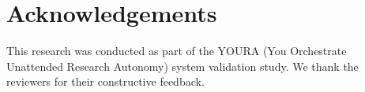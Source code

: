 \documentclass{article}
\theoremstyle{definition}
\theoremstyle{remark}
\begin{document}








\section*{Acknowledgements}
This research was conducted as part of the YOURA (You Orchestrate Unattended Research Autonomy) system validation study. We thank the reviewers for their constructive feedback.



\end{document}
